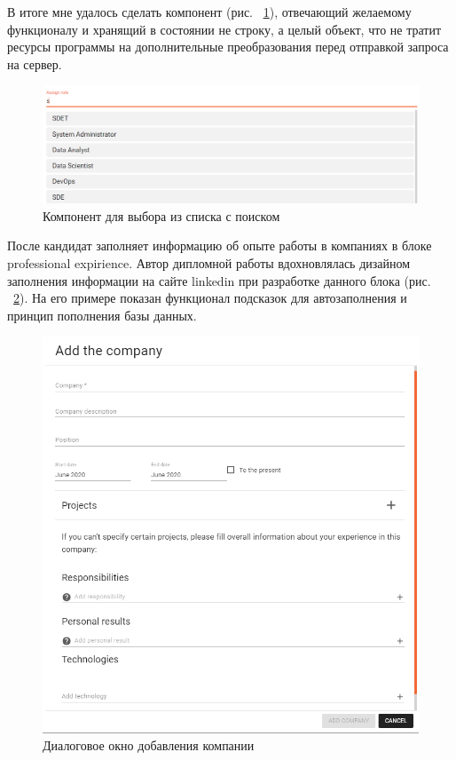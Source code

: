 \documentclass[12pt, a4paper]{diplom}
\begin{document}
В итоге мне удалось сделать компонент (рис. ~\ref{8}), отвечающий желаемому функционалу и хранящий в состоянии не строку, а целый объект, что
не тратит ресурсы программы на дополнительные преобразования перед отправкой запроса на сервер.

\begin{figure}[!ht]
\centering
\includegraphics[width=1\textwidth]{resources/role.png}
\caption{Компонент для выбора из списка с поиском}
\label{8}
\end{figure}

После кандидат заполняет информацию об опыте работы в компаниях в блоке professional expirience. Автор дипломной работы вдохновлялась дизайном заполнения информации на сайте linkedin при разработке данного блока (рис. ~\ref{9}).
На его примере показан функционал подсказок для автозаполнения и принцип пополнения базы данных.
\begin{figure}[!ht]
\centering
\includegraphics[width=1\textwidth]{resources/companycard.png}
\caption{Диалоговое окно добавления компании}
\label{9}
\end{figure}
\end{document}
